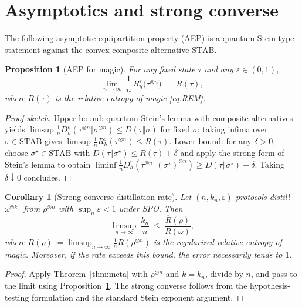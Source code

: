 \documentclass[11pt]{article}
\newtheorem{proposition}{Proposition}
\newtheorem{corollary}{Corollary}
\theoremstyle{definition}
\newcommand{\Dh}[1]{D_h^{#1}}
\begin{document}
\section{Asymptotics and strong converse}
The following asymptotic equipartition property (AEP) is a quantum Stein-type statement against the convex composite alternative $\mathrm{STAB}$.
\begin{proposition}[AEP for magic]\label{prop:AEP}
For any fixed state $\tau$ and any $\varepsilon\in(0,1)$,
\begin{equation}\label{eq:AEP}
\lim_{n\to\infty}\ \frac1n\, R_h^{\varepsilon}\!\big(\tau^{\otimes n}\big)\ =\ R(\tau),
\end{equation}
where $R(\tau)$ is the relative entropy of magic \eqref{eq:REM}.
\end{proposition}
\begin{proof}[Proof sketch]
Upper bound: quantum Stein's lemma with composite alternatives yields $\limsup \tfrac1n \Dh{\varepsilon}(\tau^{\otimes n}\Vert\sigma^{\otimes n}) \le D(\tau\Vert\sigma)$ for fixed $\sigma$; taking infima over $\sigma\in\mathrm{STAB}$ gives $\limsup \tfrac1n R_h^{\varepsilon}(\tau^{\otimes n}) \le R(\tau)$. Lower bound: for any $\delta>0$, choose $\sigma^\star\in\mathrm{STAB}$ with $D(\tau\Vert\sigma^\star)\le R(\tau)+\delta$ and apply the strong form of Stein's lemma to obtain $\liminf \tfrac1n \Dh{\varepsilon}(\tau^{\otimes n}\Vert(\sigma^\star)^{\otimes n}) \ge D(\tau\Vert\sigma^\star)-\delta$. Taking $\delta\downarrow 0$ concludes.
\end{proof}

\begin{corollary}[Strong-converse distillation rate]\label{cor:sc}
Let $(n,k_n,\varepsilon)$-protocols distill $\omega^{\otimes k_n}$ from $\rho^{\otimes n}$ with $\sup_n \varepsilon<1$ under SPO. Then
\begin{equation}\label{eq:rate-bound}
\limsup_{n\to\infty}\ \frac{k_n}{n}\ \le\ \frac{\overline{R}(\rho)}{R(\omega)},
\end{equation}
where $\overline{R}(\rho):=\limsup_{n\to\infty}\tfrac1n R(\rho^{\otimes n})$ is the regularized relative entropy of magic. Moreover, if the rate exceeds this bound, the error necessarily tends to $1$.
\end{corollary}
\begin{proof}
Apply Theorem~\ref{thm:meta} with $\rho^{\otimes n}$ and $k=k_n$, divide by $n$, and pass to the limit using Proposition~\ref{prop:AEP}. The strong converse follows from the hypothesis-testing formulation and the standard Stein exponent argument.
\end{proof}
\end{document}
